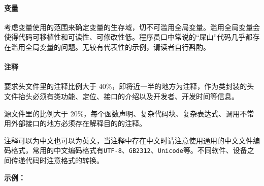 \documentclass[
]{article}
\begin{document}
\hypertarget{ux53d8ux91cf}{%
\paragraph{变量}\label{ux53d8ux91cf}}

考虑变量使用的范围来确定变量的生存域，切不可滥用全局变量。滥用全局变量会使得代码可移植性和可读性、可修改性低。程序员口中常说的``屎山''代码几乎都存在滥用全局变量的问题。无较有代表性的示例，请读者自行斟酌。

\hypertarget{ux6ce8ux91ca-1}{%
\paragraph{注释}\label{ux6ce8ux91ca-1}}

要求头文件里的注释比例大于
40\%，即将近一半的地方为注释，作为类封装的头文件抬头必须有类功能、定位、接口的介绍以及开发者、开发时间等信息。

源文件里的比例大于
20\%，每个函数声明、复杂代码块、复杂表达式、调用不常用外部接口的地方必须存在解释目的的注释。

注释可以为中文也可以为英文，当注释中存在中文时请注意使用通用的中文文件编码格式，常用的中文编码格式有\texttt{UTF-8}、\texttt{GB2312}、\texttt{Unicode}等。不同软件、设备之间传递代码时注意格式的转换。

\textbf{示例：}
\end{document}
